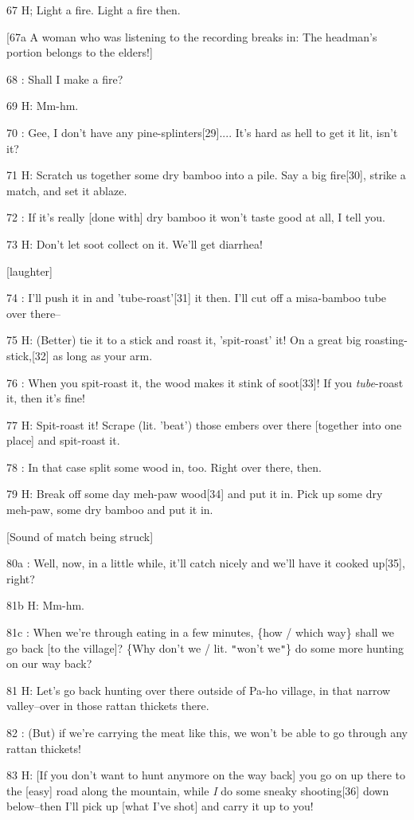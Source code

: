 67 H; Light a fire. Light a fire then.

[67a A woman who was listening to the recording breaks in: The headman's portion
belongs to the elders!]

68  : Shall I make a fire?

69 H: Mm-hm.

70  : Gee, I don't have any pine-splinters[29].... It's hard as hell to get it
lit, isn't it?

71 H: Scratch us together some dry bamboo into a pile. Say a big fire[30], strike
a match, and set it ablaze.

72  : If it's really [done with] dry bamboo it won't taste good at all, I tell
you.

73 H: Don't let soot collect on it. We'll get diarrhea!

[laughter]

74  : I'll push it in and 'tube-roast'[31] it then. I'll cut off a misa-bamboo
tube over there--

75 H: (Better) tie it to a stick and roast it, 'spit-roast' it! On a great big
roasting-stick,[32] as long as your arm.

76  : When you spit-roast it, the wood makes it stink of soot[33]! If you \emph{tube}-roast
it, then it's fine!

77 H: Spit-roast it! Scrape (lit. 'beat') those embers over there [together into
one place] and spit-roast it.

78  : In that case split some wood in, too. Right over there, then.

79 H: Break off some day meh-paw wood[34] and put it in. Pick up some dry meh-paw,
some dry bamboo and put it in.

[Sound of match being struck]

80a  : Well, now, in a little while, it'll catch nicely and we'll have it cooked
up[35], right?

81b H: Mm-hm.

81c  : When we're through eating in a few minutes, \{how / which way\} shall we
go back [to the village]? \{Why don't we / lit. \texttt{"}won't we\texttt{"}\}
do some more hunting on our way back?

81 H: Let's go back hunting over there outside of Pa-ho village, in that narrow
valley--over in those rattan thickets there.

82  : (But) if we're carrying the meat like this, we won't be able to go through
any rattan thickets!

83 H: [If you don't want to hunt anymore on the way back] you go on up there to
the [easy] road along the mountain, while \textit{I} do some sneaky shooting[36]
down below--then I'll pick up [what I've shot] and carry it up to you!

